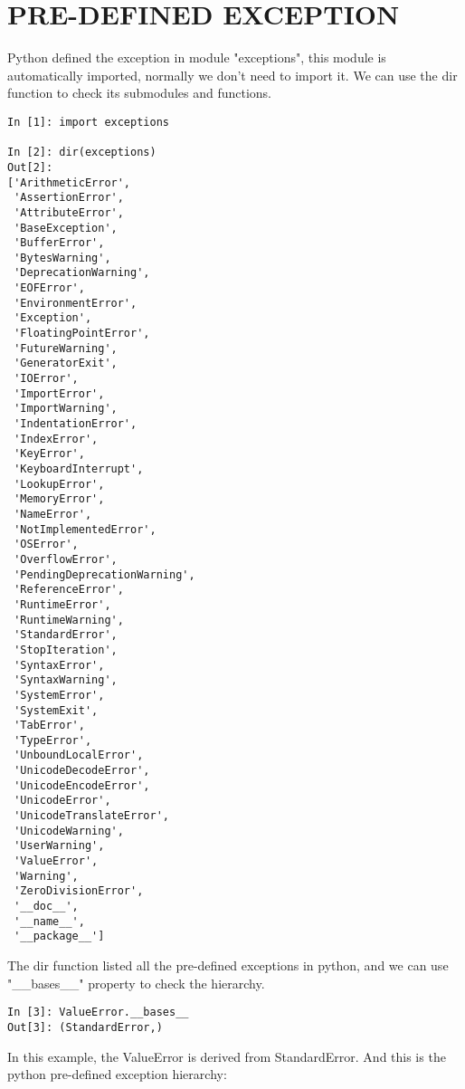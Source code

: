 \newpage
\section{PRE-DEFINED EXCEPTION}
Python defined the exception in module "exceptions", this module is automatically imported, 
normally we don't need to import it. We can use the dir function to check its submodules and functions.
\begin{lstlisting}
In [1]: import exceptions

In [2]: dir(exceptions)
Out[2]: 
['ArithmeticError',
 'AssertionError',
 'AttributeError',
 'BaseException',
 'BufferError',
 'BytesWarning',
 'DeprecationWarning',
 'EOFError',
 'EnvironmentError',
 'Exception',
 'FloatingPointError',
 'FutureWarning',
 'GeneratorExit',
 'IOError',
 'ImportError',
 'ImportWarning',
 'IndentationError',
 'IndexError',
 'KeyError',
 'KeyboardInterrupt',
 'LookupError',
 'MemoryError',
 'NameError',
 'NotImplementedError',
 'OSError',
 'OverflowError',
 'PendingDeprecationWarning',
 'ReferenceError',
 'RuntimeError',
 'RuntimeWarning',
 'StandardError',
 'StopIteration',
 'SyntaxError',
 'SyntaxWarning',
 'SystemError',
 'SystemExit',
 'TabError',
 'TypeError',
 'UnboundLocalError',
 'UnicodeDecodeError',
 'UnicodeEncodeError',
 'UnicodeError',
 'UnicodeTranslateError',
 'UnicodeWarning',
 'UserWarning',
 'ValueError',
 'Warning',
 'ZeroDivisionError',
 '__doc__',
 '__name__',
 '__package__']
\end{lstlisting}
The dir function listed all the pre-defined exceptions in python, 
and we can use "\_\_bases\_\_" property to check the hierarchy.
\begin{lstlisting}
In [3]: ValueError.__bases__
Out[3]: (StandardError,)
\end{lstlisting}
In this example, the ValueError is derived from StandardError. 
And this is the python pre-defined exception hierarchy:
